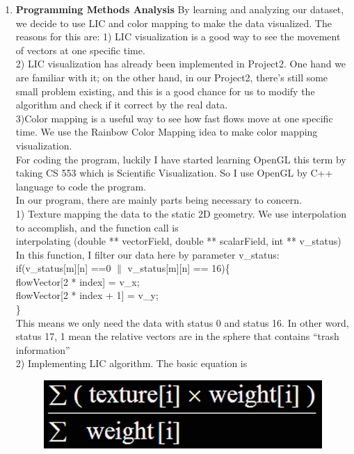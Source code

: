\documentclass[letterpaper,12pt,titlepage,fleqn]{article}
\begin{document}
\begin{CJK}{UTF8}{gkai}
\begin{enumerate}
\item \textbf{Programming Methods Analysis}
By learning and analyzing our dataset, we decide to use LIC and color mapping to make the data visualized. The reasons for this are:
    1) LIC visualization is a good way to see the movement of vectors at one specific time.\\
    2) LIC visualization has already been implemented in Project2. One hand we are familiar with it; on the other hand, in our Project2, there’s still some small problem existing, and this is a good chance for us to modify the algorithm and check if it correct by the real data.\\
    3)Color mapping is a useful way to see how fast flows move at one specific time. We use the Rainbow Color Mapping idea to make color mapping visualization.\\
For coding the program, luckily I have started learning OpenGL this term by taking CS 553 which is Scientific Visualization. So I use OpenGL by C++ language to code the program.\\
In our program, there are mainly parts being necessary to concern.\\
1) Texture mapping the data to the static 2D geometry. We use interpolation to accomplish, and the function call is\\
 interpolating (double ** vectorField, double ** scalarField, int ** v\_status)\\
In this function, I filter our data here by parameter v\_status: \\
 if(v\_status[m][n] ==0 $\lVert$ v\_status[m][n] == 16)\{\\
	  flowVector[2 * index] = v\_x;\\
	  flowVector[2 * index + 1] = v\_y;\\
\}\\
This means we only need the data with status 0 and status 16. In other word, status 17, 1 mean the relative vectors are in the sphere that contains “trash information” \\

2) Implementing LIC algorithm. The basic equation is
\begin{figure}[h]
	\centering
	\includegraphics[width=0.5\linewidth]{LIC.jpg}

\end{figure}


\end{enumerate}
\end{CJK}
\end{document}

